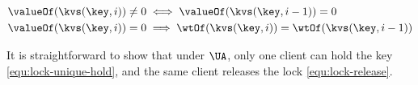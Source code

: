 \spaceshrink{-15pt}
{\displaymathfont
\begin{align}
& \valueOf(\kvs(\key,i)) \neq 0 \iff \valueOf(\kvs(\key,i-1)) = 0
\label{equ:lock-unique-hold}
\\ & \valueOf(\kvs(\key,i)) = 0 \implies \wtOf(\kvs(\key,i)) = \wtOf(\kvs(\key,i-1))
\label{equ:lock-release}
\end{align}
\normalsize}
\spaceshrink{-15pt}

\noindent
It is straightforward to show that under \( \UA \), 
only one client can hold the key \eqref{equ:lock-unique-hold},
and the same client releases the lock \eqref{equ:lock-release}.

